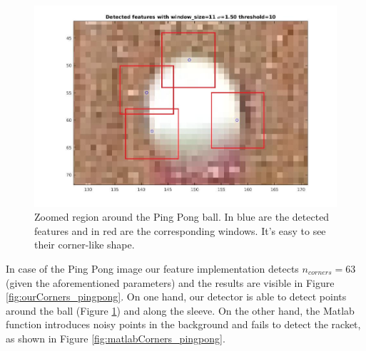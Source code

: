 \documentclass[11pt]{article}
\begin{document}
\begin{figure}[H]
	\centering
	\includegraphics[width=.8\textwidth]{imgs/ball_feature_corners.jpg}
	\caption{Zoomed region around the Ping Pong ball. In blue are the detected
	features and in red are the corresponding windows. It's easy to see their
	corner-like shape.}
	\label{fig:ball_corners}
\end{figure}

In case of the Ping Pong image our feature implementation detects $n_{corners} =
63$ (given the aforementioned parameters) and the results are visible in Figure
\ref{fig:ourCorners_pingpong}. On one hand, our detector is able to detect
points around the ball (Figure \ref{fig:ball_corners}) and along the sleeve. On
the other hand, the Matlab function introduces noisy points in the background
and fails to detect the racket, as shown in Figure
\ref{fig:matlabCorners_pingpong}.
\end{document}
